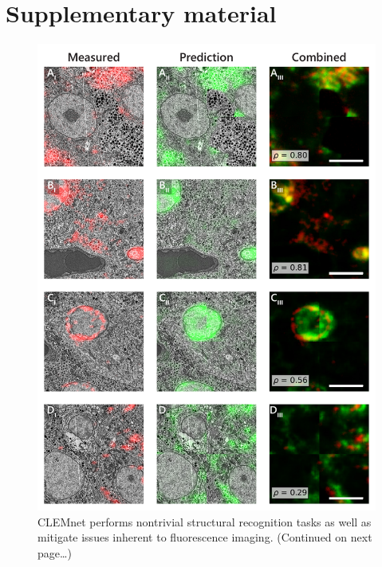 \clearpage

\renewcommand\thesection{\arabic{chapter}.\Alph{section}}
\setcounter{section}{0}
\section{Supplementary material}
\label{sec:4_supplement}

\renewcommand{\thefigure}{4.A\arabic{figure}}
\setcounter{figure}{0}



\begin{figure}[!tbh]
    \centering
    \includegraphics[width=0.95\linewidth]{chapter-4/figures_PDF/fig4-S1_rois.pdf}
    \caption{CLEMnet performs nontrivial structural recognition tasks as well as mitigate issues inherent to fluorescence imaging. (Continued on next page\ldots)}
    \label{fig:4.S1_rois}
\end{figure}
